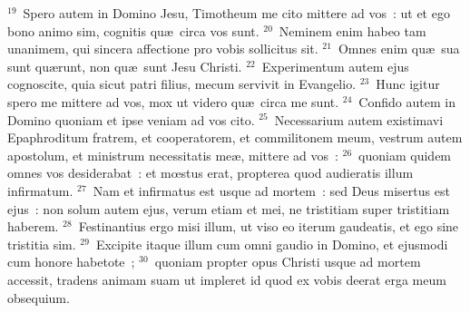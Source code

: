 ${}^{19}$~Spero autem in Domino Jesu, Timotheum me cito mittere ad vos~: ut et ego bono animo sim, cognitis qu\ae\ circa vos sunt.
${}^{20}$~Neminem enim habeo tam unanimem, qui sincera affectione pro vobis sollicitus sit.
${}^{21}$~Omnes enim qu\ae\ sua sunt qu\ae runt, non qu\ae\ sunt Jesu Christi.
${}^{22}$~Experimentum autem ejus cognoscite, quia sicut patri filius, mecum servivit in Evangelio.
${}^{23}$~Hunc igitur spero me mittere ad vos, mox ut videro qu\ae\ circa me sunt.
${}^{24}$~Confido autem in Domino quoniam et ipse veniam ad vos cito.
${}^{25}$~Necessarium autem existimavi Epaphroditum fratrem, et cooperatorem, et commilitonem meum, vestrum autem apostolum, et ministrum necessitatis me\ae , mittere ad vos~:
${}^{26}$~quoniam quidem omnes vos desiderabat~: et mœstus erat, propterea quod audieratis illum infirmatum.
${}^{27}$~Nam et infirmatus est usque ad mortem~: sed Deus misertus est ejus~: non solum autem ejus, verum etiam et mei, ne tristitiam super tristitiam haberem.
${}^{28}$~Festinantius ergo misi illum, ut viso eo iterum gaudeatis, et ego sine tristitia sim.
${}^{29}$~Excipite itaque illum cum omni gaudio in Domino, et ejusmodi cum honore habetote~;
${}^{30}$~quoniam propter opus Christi usque ad mortem accessit, tradens animam suam ut impleret id quod ex vobis deerat erga meum obsequium.

